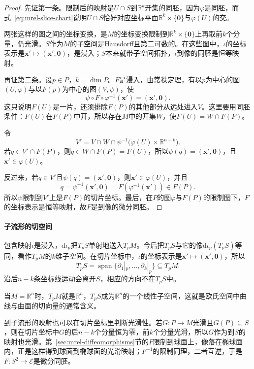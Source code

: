 \begin{proof}
先证第一条。限制后的映射是$U\cap S$到$\mathbb R^k$开集的同胚，因为$\varphi$是同胚，而式~\eqref{eq:mrel-slice-chart}说明$U\cap S$恰好对应坐标平面$\mathbb R^k\times\{\bm 0\}$与$\varphi(U)$的交。

两张这样的图之间的坐标变换，是$M$的坐标变换限制到$\mathbb R^k\times\{\bm 0\}$上再取前$k$个分量，仍光滑。$S$作为$M$的子空间是Hausdorff且第二可数的。在这些图中，$\iota$的坐标表示是$\bm x'\mapsto(\bm x',\bm 0)$，是浸入；$S$本来就带子空间拓扑，$\iota$到像的同胚是恒等映射。

再证第二条。设$p\in P$，$k=\dim P$。$F$是浸入，由常秩定理，有以$p$为中心的图$(U,\varphi)$与以$F(p)$为中心的图$(V,\psi)$，使
\[
\psi\circ F\circ\varphi^{-1}(\bm x')=(\bm x',\bm 0).
\]
这只说明$F(U)$是一片，还须排除$F(P)$的其他部分从远处进入$V$。这里要用同胚条件：$F(U)$在$F(P)$中开，所以存在$M$中的开集$W$，使$F(U)=W\cap F(P)$。

令
\[
V'=V\cap W\cap\psi^{-1}\bigl(\varphi(U)\times\mathbb R^{n-k}\bigr).
\]
若$q\in V'\cap F(P)$，则$q\in W\cap F(P)=F(U)$，所以$\psi(q)=(\bm x',\bm 0)$，且$\bm x'\in\varphi(U)$。

反过来，若$q\in V'$且$\psi(q)=(\bm x',\bm 0)$，则$\bm x'\in\varphi(U)$，并且
\[
q=\psi^{-1}(\bm x',\bm 0)=F(\varphi^{-1}(\bm x'))\in F(P).
\]
所以$\psi$限制到$V'$上是$F(P)$的切片坐标。最后，在$P$的图$\varphi$与$F(P)$的限制图下，$F$的坐标表示是恒等映射，故$F$是到像的微分同胚。
\end{proof}

\paragraph{子流形的切空间}
包含映射$\iota$是浸入，$\mathrm d\iota_p$把$T_pS$单射地送入$T_pM$。今后把$T_pS$与它的像$\mathrm d\iota_p(T_pS)$等同，看作$T_pM$的$k$维子空间。在切片坐标中，$\iota$的坐标表示是$\bm x'\mapsto(\bm x',\bm 0)$，所以
\begin{equation}
T_pS=\operatorname{span}\bigl\{\partial_1|_p,\ldots,\partial_k|_p\bigr\}\subseteq T_pM .
\label{eq:mrel-submanifold-tangent}
\end{equation}
沿后$n-k$条坐标线运动会离开$S$，相应的方向不在$T_pS$中。

当$M=\mathbb R^n$时，$T_pM$就是$\mathbb R^n$，$T_pS$成为$\mathbb R^n$的一个线性子空间，这就是欧氏空间中曲线与曲面的切向量的通常含义。

到子流形的映射也可以在切片坐标里判断光滑性。若$G:P\to M$光滑且$G(P)\subseteq S$，则在切片坐标中$G$的后$n-k$个分量恒为零，前$k$个分量光滑，所以$G$作为到$S$的映射也光滑。第~\ref{sec:mrel-diffeomorphisms}节的$F$限制到球面上，像落在椭球面内，正是这样得到球面到椭球面的光滑映射；$F^{-1}$的限制同理，二者互逆，于是$F:S^2\to\mathcal E$是微分同胚。

